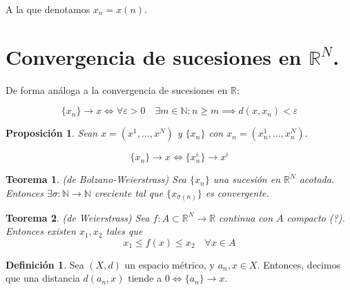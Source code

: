 \documentclass[11pt,a4paper, titlepage]{article}
\theoremstyle{plain}
\newtheorem*{nth}{Teorema}
\newtheorem*{nprop}{Proposición}
\theoremstyle{remark}
\theoremstyle{definition}
\newtheorem*{ndef}{Definición}
\begin{document}
A la que denotamos $x_n = x(n)$.

\section*{Convergencia de sucesiones en $\mathbb{R}^N$.}

De forma análoga a la convergencia de sucesiones en $\mathbb{R}$:

\[
	\{x_n\} \rightarrow x \iff \forall \varepsilon > 0\quad \exists m\in\mathbb{N} : n \ge m \implies d(x,x_n) < \varepsilon
\]

\begin{nprop}
	Sean $x = (x^1, \dots, x^N)$ y $\{x_n\}$ con $x_n = (x^1_n, \dots, x^N_n)$.
	
	\[
		\{x_n\} \rightarrow x \iff \{x^i_n\} \rightarrow x^i
	\]
\end{nprop}




\begin{nth} (de Bolzano-Weierstrass)
Sea $\{x_n\}$ una sucesión en $\mathbb{R}^N$ acotada. Entonces $\exists \sigma : \mathbb{N} \longrightarrow \mathbb{N}$ creciente tal que $\{x_{\sigma(n)}\}$ es convergente.
\end{nth}

\begin{nth} (de Weierstrass)
	Sea $f : A \subset \mathbb{R}^N \longrightarrow \mathbb{R}$ continua con $A$ compacto (?). Entonces existen $x_1,x_2$ tales que
	\[
		x_1 \le f(x) \le x_2\quad \forall x \in A 
	\]
\end{nth}



\begin{ndef}
Sea $(X,d)$ un espacio métrico, y $a_n,x\in X$. Entonces, decimos que una distancia $d(a_n,x)$ tiende a $0 \iff \{a_n\} \rightarrow x$.
\end{ndef}
\end{document}
